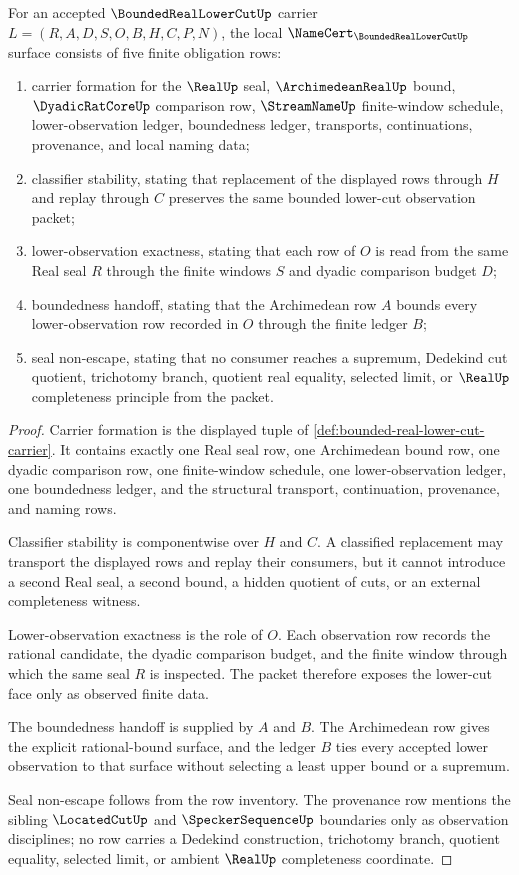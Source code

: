 \begin{theorem}
\label{thm:bounded-real-lower-cut-namecert-obligations}
For an accepted $\BoundedRealLowerCutUp$ carrier $L=(R,A,D,S,O,B,H,C,P,N)$, the local $\NameCert_{\BoundedRealLowerCutUp}$ surface consists of five finite obligation rows:
\begin{enumerate}
\item carrier formation for the $\RealUp$ seal, $\ArchimedeanRealUp$ bound, $\DyadicRatCoreUp$ comparison row, $\StreamNameUp$ finite-window schedule, lower-observation ledger, boundedness ledger, transports, continuations, provenance, and local naming data;
\item classifier stability, stating that replacement of the displayed rows through $H$ and replay through $C$ preserves the same bounded lower-cut observation packet;
\item lower-observation exactness, stating that each row of $O$ is read from the same Real seal $R$ through the finite windows $S$ and dyadic comparison budget $D$;
\item boundedness handoff, stating that the Archimedean row $A$ bounds every lower-observation row recorded in $O$ through the finite ledger $B$;
\item seal non-escape, stating that no consumer reaches a supremum, Dedekind cut quotient, trichotomy branch, quotient real equality, selected limit, or $\RealUp$ completeness principle from the packet.
\end{enumerate}
\end{theorem}
\begin{proof}
Carrier formation is the displayed tuple of \autoref{def:bounded-real-lower-cut-carrier}. It contains exactly one Real seal row, one Archimedean bound row, one dyadic comparison row, one finite-window schedule, one lower-observation ledger, one boundedness ledger, and the structural transport, continuation, provenance, and naming rows.

Classifier stability is componentwise over $H$ and $C$. A classified replacement may transport the displayed rows and replay their consumers, but it cannot introduce a second Real seal, a second bound, a hidden quotient of cuts, or an external completeness witness.

Lower-observation exactness is the role of $O$. Each observation row records the rational candidate, the dyadic comparison budget, and the finite window through which the same seal $R$ is inspected. The packet therefore exposes the lower-cut face only as observed finite data.

The boundedness handoff is supplied by $A$ and $B$. The Archimedean row gives the explicit rational-bound surface, and the ledger $B$ ties every accepted lower observation to that surface without selecting a least upper bound or a supremum.

Seal non-escape follows from the row inventory. The provenance row mentions the sibling $\LocatedCutUp$ and $\SpeckerSequenceUp$ boundaries only as observation disciplines; no row carries a Dedekind construction, trichotomy branch, quotient equality, selected limit, or ambient $\RealUp$ completeness coordinate.
\end{proof}

